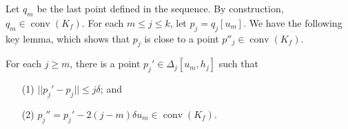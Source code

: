\documentclass[11pt]{myclass}
\newcommand{\conv}[1]{\mathop{\mathrm{conv}}(#1)}
\newcommand{\point}[3]{{#1}[#3,#2]}
\newcommand{\rotate}[2]{{#1}[#2]}
\begin{document}
Let $q_m$ be the last point defined in the sequence. By construction, $q_m \in \conv{K_f}$.  
For each $m \leq j \leq k$, let $p_j = \rotate{q_j}{u_m}$.
We have the following key lemma, which shows that $p_j$ is close to a point $p''_j \in \conv{K_f}$.


\begin{lemma} \label{lem:key}
 For each $j\geq m$, there is a point $p_j'\in \point{\Delta_j}{h_j}{u_m}$ such that 
 \begin{itemize} \denselist 
   \item[(1)] $|| p_j' - p_j|| \leq j \delta$; and  
   \item[(2)] $p_j'' = p_j' - 2(j-m) \delta u_m \in \conv{K_f}$. 
 \end{itemize}
\end{lemma}
\end{document}
